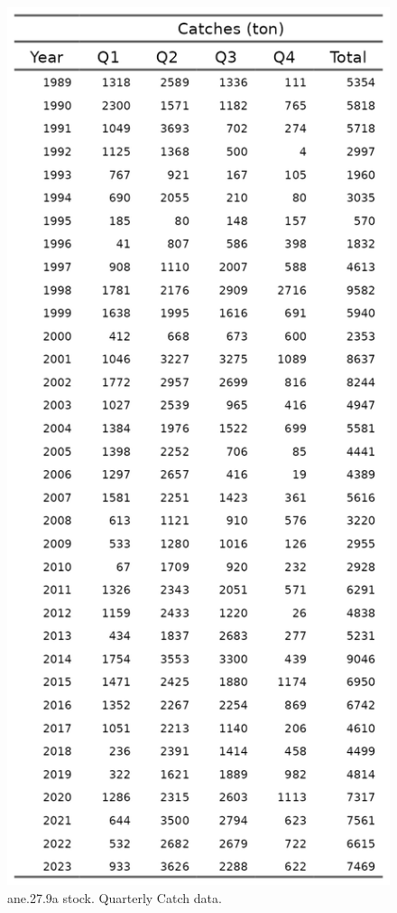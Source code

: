 \documentclass[
]{article}
\begin{document}
\begin{figure}[H]

{\centering \includegraphics[width=0.95\linewidth]{report/run/S1.0_4FLEETS/tb_catches} 

}

\caption{ane.27.9a stock. Quarterly Catch data. }\label{fig:unnamed-chunk-4}
\end{figure}
\end{document}
